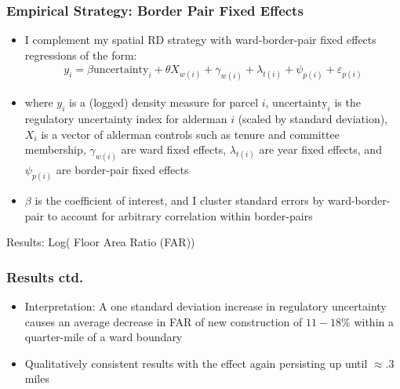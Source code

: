 \begin{frame}
    \frametitle{Empirical Strategy: Border Pair Fixed Effects} 
            \begin{itemize} 
                \item I complement my spatial RD strategy with ward-border-pair fixed effects regressions  {\scriptsize{\citep{black_better_1999}}} of the form:
                \[
                \begin{aligned}
                    y_i =\beta \text{uncertainty}_i + \theta X_{w(i)} + \gamma_{w(i)} + \lambda_{t(i)} + \psi_{p(i)} + \varepsilon_{p(i)}
                \end{aligned}
                \]
                \item where $y_i$ is a (logged) density measure for parcel $i$, $\text{uncertainty}_i$ is the regulatory uncertainty index for alderman $i$ (scaled by standard deviation), $X_i$ is a vector of alderman controls such as tenure and committee membership, $\gamma_{w(i)}$ are ward fixed effects, $\lambda_{t(i)}$ are year fixed effects, and $\psi_{p(i)}$ are border-pair fixed effects
                \item $\beta$ is the coefficient of interest, and I cluster standard errors by ward-border-pair to account for arbitrary correlation within border-pairs
            \end{itemize}
\end{frame}


\begin{frame}[t,label=main_FAR_table]{Results: Log( Floor Area Ratio (FAR))}
    \centering
    \scriptsize{}
    \vfill\hfill
    \hyperlink{levels_FAR_table}{}
    \hspace{0.2em}\hyperlink{lapu_table}{}
    \hspace{0.2em}\hyperlink{bcr_table}{}
    \hspace{0.2em}\hyperlink{lps_table}{}
\end{frame}


\begin{frame}
    \frametitle{Results ctd.} 
        \begin{itemize}
            \item Interpretation: A one standard deviation increase in regulatory uncertainty causes an average decrease in FAR of new construction of $11-18\%$ within a quarter-mile of a ward boundary
            \item Qualitatively consistent results with the effect again persisting up until $\approx .3$ miles
        \end{itemize}
 \end{frame} 


